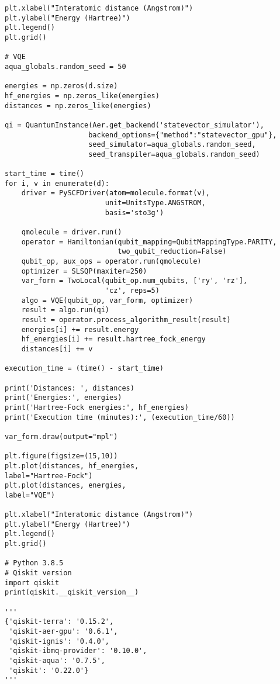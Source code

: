 \begin{footnotesize}
\begin{verbatim}
plt.xlabel("Interatomic distance (Angstrom)")
plt.ylabel("Energy (Hartree)")
plt.legend()
plt.grid()

# VQE
aqua_globals.random_seed = 50

energies = np.zeros(d.size)
hf_energies = np.zeros_like(energies)
distances = np.zeros_like(energies)

qi = QuantumInstance(Aer.get_backend('statevector_simulator'),
                    backend_options={"method":"statevector_gpu"},
                    seed_simulator=aqua_globals.random_seed,
                    seed_transpiler=aqua_globals.random_seed)

start_time = time()
for i, v in enumerate(d):
    driver = PySCFDriver(atom=molecule.format(v),
                        unit=UnitsType.ANGSTROM,
                        basis='sto3g')
    
    qmolecule = driver.run()
    operator = Hamiltonian(qubit_mapping=QubitMappingType.PARITY,
                           two_qubit_reduction=False)
    qubit_op, aux_ops = operator.run(qmolecule)
    optimizer = SLSQP(maxiter=250)
    var_form = TwoLocal(qubit_op.num_qubits, ['ry', 'rz'],
                        'cz', reps=5)
    algo = VQE(qubit_op, var_form, optimizer)
    result = algo.run(qi)
    result = operator.process_algorithm_result(result)
    energies[i] += result.energy
    hf_energies[i] += result.hartree_fock_energy
    distances[i] += v

execution_time = (time() - start_time)

print('Distances: ', distances)
print('Energies:', energies)
print('Hartree-Fock energies:', hf_energies)
print('Execution time (minutes):', (execution_time/60))

var_form.draw(output="mpl")

plt.figure(figsize=(15,10))
plt.plot(distances, hf_energies,
label="Hartree-Fock")
plt.plot(distances, energies,
label="VQE")

plt.xlabel("Interatomic distance (Angstrom)")
plt.ylabel("Energy (Hartree)")
plt.legend()
plt.grid()

# Python 3.8.5
# Qiskit version
import qiskit
print(qiskit.__qiskit_version__)

'''
{'qiskit-terra': '0.15.2',
 'qiskit-aer-gpu': '0.6.1',
 'qiskit-ignis': '0.4.0',
 'qiskit-ibmq-provider': '0.10.0',
 'qiskit-aqua': '0.7.5',
 'qiskit': '0.22.0'}
'''
\end{verbatim}
\end{footnotesize}

